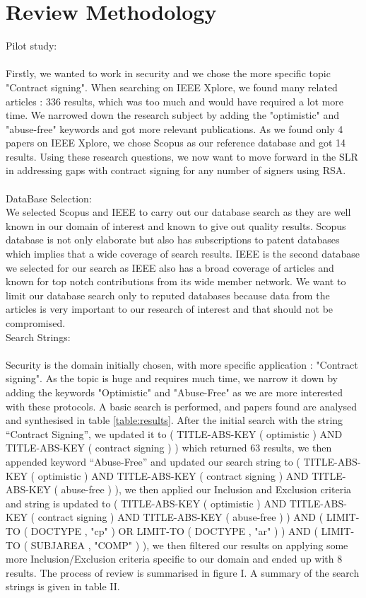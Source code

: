 \section{Review Methodology}

Pilot study:\\
\\
Firstly, we wanted to work in security and we chose the more specific topic "Contract signing". When searching on IEEE Xplore, we found many related articles : 336 results, which was too much and would have required a lot more time. We narrowed down the research subject by adding the "optimistic" and "abuse-free" keywords and got more relevant publications. As we found only 4 papers on IEEE Xplore, we chose Scopus as our reference database and got 14 results. Using these research questions, we now want to move forward in the SLR in addressing gaps with contract signing for any number of signers using RSA.\\
\\
DataBase Selection: 
\\
We selected Scopus and IEEE to carry out our database search as they are well known in our domain of interest and known to give out quality results. Scopus database is not only elaborate but also has subscriptions to patent databases which implies that a wide coverage of search results. IEEE is the second database we selected for our search as IEEE also has a broad coverage of articles and known for top notch contributions from its wide member network. We want to limit our database search only to reputed databases because data from the articles is very important to our research of interest and that should not be compromised.   
\\
Search Strings:\\
\\
Security is the domain initially chosen, with more specific application : "Contract signing". As the topic is huge and requires much time, we narrow it down by adding the keywords "Optimistic" and "Abuse-Free" as we are more interested with these protocols. A basic search is performed, and papers found are analysed and synthesised in table \ref{table:results}. After the initial search with the string “Contract Signing”, we updated it to ( TITLE-ABS-KEY ( optimistic )  AND  TITLE-ABS-KEY ( contract  signing ) ) which returned 63 results, we then appended keyword “Abuse-Free” and updated our search string to ( TITLE-ABS-KEY ( optimistic )  AND  TITLE-ABS-KEY ( contract  signing )  AND  TITLE-ABS-KEY ( abuse-free ) ), we then applied our Inclusion and Exclusion criteria and string is updated to ( TITLE-ABS-KEY ( optimistic )  AND  TITLE-ABS-KEY ( contract  signing )  AND  TITLE-ABS-KEY ( abuse-free ) )  AND  ( LIMIT-TO ( DOCTYPE ,  "cp" )  OR  LIMIT-TO ( DOCTYPE ,  "ar" ) )  AND  ( LIMIT-TO ( SUBJAREA ,  "COMP" ) ), we then filtered our results on applying some more Inclusion/Exclusion criteria specific to our domain and ended up with 8 results. The process of review is summarised in figure I. A summary of the search strings is given in table II.
